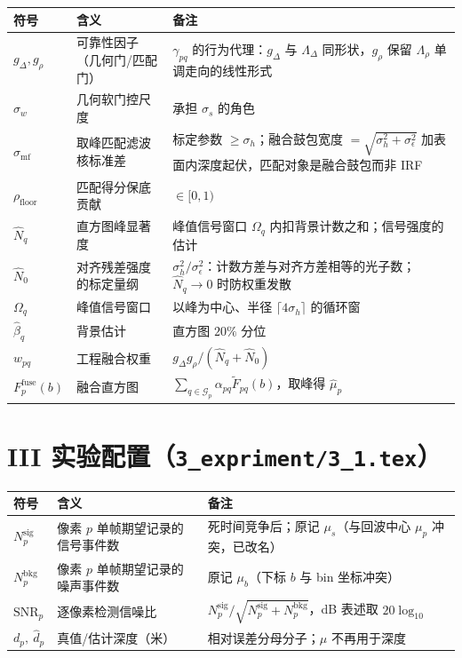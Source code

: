 \documentclass[11pt]{ctexart}
\begin{document}
\begin{center}
\begin{tabular}{@{}llp{}@{}}
\toprule
符号 & 含义 & 备注 \\
\midrule
$g_{\Delta},g_{\rho}$ & 可靠性因子（几何门/匹配门） & $\gamma_{pq}$ 的行为代理：$g_\Delta$ 与 $\Lambda_\Delta$ 同形状，$g_\rho$ 保留 $\Lambda_\rho$ 单调走向的线性形式 \\
$\sigma_w$ & 几何软门控尺度 & 承担 $\sigma_s$ 的角色 \\
$\sigma_{\mathrm{mf}}$ & 取峰匹配滤波核标准差 & 标定参数 $\ge\sigma_h$；融合鼓包宽度 $=\sqrt{\sigma_h^2+\sigma_\epsilon^2}$ 加表面内深度起伏，匹配对象是融合鼓包而非 IRF \\
$\rho_{\mathrm{floor}}$ & 匹配得分保底贡献 & $\in[0,1)$ \\
$\hat N_q$ & 直方图峰显著度 & 峰值信号窗口 $\Omega_q$ 内扣背景计数之和；信号强度的估计 \\
$\hat N_0$ & 对齐残差强度的标定量纲 & $\sigma_h^2/\sigma_\epsilon^2$：计数方差与对齐方差相等的光子数；$\hat N_q\to0$ 时防权重发散 \\
$\Omega_q$ & 峰值信号窗口 & 以峰为中心、半径 $\lceil4\sigma_h\rceil$ 的循环窗 \\
$\hat\beta_q$ & 背景估计 & 直方图 $20\%$ 分位 \\
$w_{pq}$ & 工程融合权重 & $g_\Delta g_\rho/(\hat N_q+\hat N_0)$ \\
$F_p^{\mathrm{fuse}}(b)$ & 融合直方图 & $\sum_{q\in\mathcal{G}_p}\alpha_{pq}\widetilde F_{pq}(b)$，取峰得 $\hat\mu_p$ \\
\bottomrule
\end{tabular}
\end{center}

\section*{III 实验配置（\texttt{3\_expriment/3\_1.tex}）}
\begin{center}
\begin{tabular}{@{}llp{}@{}}
\toprule
符号 & 含义 & 备注 \\
\midrule
$N^{\mathrm{sig}}_p$ & 像素 $p$ 单帧期望记录的信号事件数 & 死时间竞争后；原记 $\mu_s$（与回波中心 $\mu_p$ 冲突，已改名） \\
$N^{\mathrm{bkg}}_p$ & 像素 $p$ 单帧期望记录的噪声事件数 & 原记 $\mu_b$（下标 $b$ 与 bin 坐标冲突） \\
$\mathrm{SNR}_p$ & 逐像素检测信噪比 & $N^{\mathrm{sig}}_p/\sqrt{N^{\mathrm{sig}}_p+N^{\mathrm{bkg}}_p}$，dB 表述取 $20\log_{10}$ \\
$d_p,\ \hat d_p$ & 真值/估计深度（米） & 相对误差分母分子；$\mu$ 不再用于深度 \\
\bottomrule
\end{tabular}
\end{center}
\end{document}
